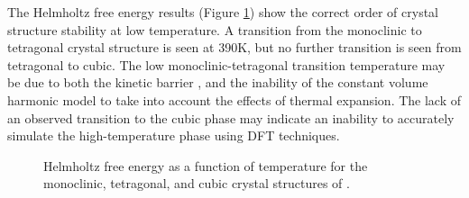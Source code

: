 

The Helmholtz free energy results (Figure \ref{Figure:helmholtz}) show the correct order of crystal structure stability at low temperature. A transition from the monoclinic to tetragonal crystal structure is seen at 390K, but no further transition is seen from tetragonal to cubic. The low monoclinic-tetragonal transition temperature may be due to both the kinetic barrier \cite{bansal1972martensitic,bansal1974martensitic}, and the inability of the constant volume harmonic model to take into account the effects of thermal expansion. The lack of an observed transition to the cubic phase may indicate an inability to accurately simulate the high-temperature phase using DFT techniques. 

\begin{figure}[ht] %
\begin{center}
		\caption{Helmholtz free energy as a function of temperature for the monoclinic, tetragonal, and cubic crystal structures of \zirconia .}
		\label{Figure:helmholtz}
	\end{center}
\end{figure}

